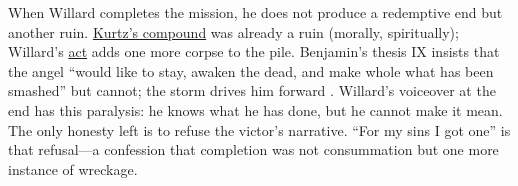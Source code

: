 When Willard completes the mission, he does not produce a redemptive end but another ruin.
\hyperref[scene:kurtz-compound]{Kurtz's compound} was already a ruin (morally, spiritually);
Willard's \hyperref[scene:assassination]{act} adds one more corpse to the pile. Benjamin's
thesis IX insists that the angel ``would like to stay, awaken the dead, and make whole what
has been smashed'' but cannot; the storm drives him forward
\parencite{BenjaminTheses1969}. Willard's voiceover at the end has this paralysis: he knows
what he has done, but he cannot make it mean. The only honesty left is to refuse the victor's
narrative. ``For my sins I got one'' is that refusal---a confession that completion was not
consummation but one more instance of wreckage.
